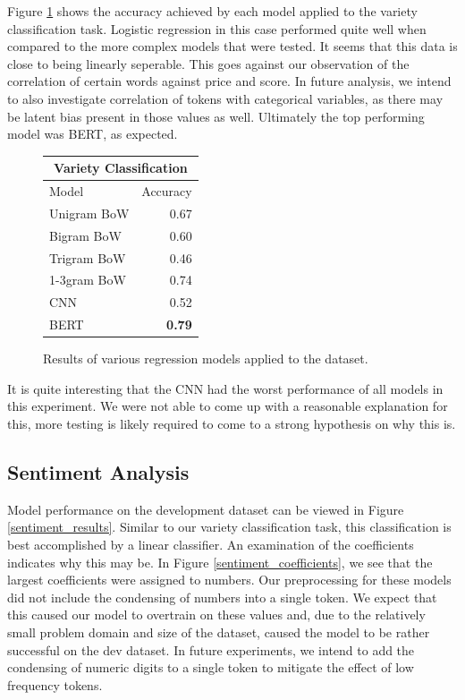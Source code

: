 \documentclass[12pt]{IEEEtran}
\begin{document}
    Figure \ref{classification_results} shows the accuracy achieved by each model applied to the variety classification task. Logistic regression in this case performed quite well when compared to the more complex models that were tested. It seems that this data is close to being linearly seperable. This goes against our observation of the correlation of certain words against price and score. In future analysis, we intend to also investigate correlation of tokens with categorical variables, as there may be latent bias present in those values as well. Ultimately the top performing model was BERT, as expected. \par
\begin{figure}[H]
    \centering
    \begin{tabular}{ |l|r|  }
        \hline
        \multicolumn{2}{|c|}{Variety Classification} \\
        \hline
        Model & Accuracy \\
        \hline
        Unigram BoW   & 0.67 \\
        Bigram BoW   & 0.60 \\
        Trigram BoW  & 0.46 \\
        1-3gram BoW   & 0.74 \\
        \hline
        CNN                    & 0.52 \\
        \hline
        BERT                   & \textbf{0.79} \\
        \hline
    \end{tabular}
    \caption{ Results of various regression models applied to the dataset. }
    \label{classification_results}
\end{figure}
    It is quite interesting that the CNN had the worst performance of all models in this experiment. We were not able to come up with a reasonable explanation for this, more testing is likely required to come to a strong hypothesis on why this is.\par



\subsection{Sentiment Analysis}
    Model performance on the development dataset can be viewed in Figure \ref{sentiment_results}. Similar to our variety classification task, this classification is best accomplished by a linear classifier. An examination of the coefficients indicates why this may be. In Figure \ref{sentiment_coefficients}, we see that the largest coefficients were assigned to numbers. Our preprocessing for these models did not include the condensing of numbers into a single token. We expect that this caused our model to overtrain on these values and, due to the relatively small problem domain and size of the dataset, caused the model to be rather successful on the dev dataset. In future experiments, we intend to add the condensing of numeric digits to a single token to mitigate the effect of low frequency tokens.
\end{document}
